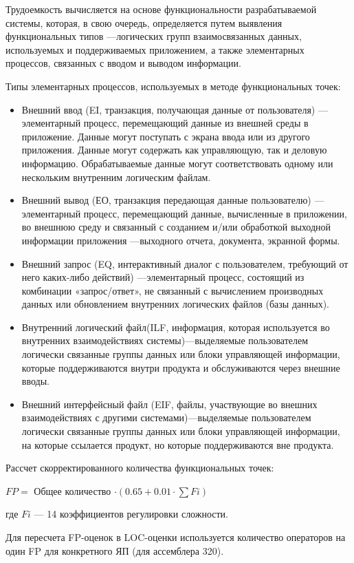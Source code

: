 \documentclass[a4paper,14pt]{article}
\begin{document}
Трудоемкость вычисляется на основе функциональности разрабатываемой системы, которая, в свою очередь, определяется путем выявления функциональных типов —логических групп взаимосвязанных данных, используемых и поддерживаемых приложением, а также элементарных процессов, связанных с вводом и выводом информации.

Типы элементарных процессов, используемых в методе функциональных точек:

\begin{itemize}
    \item Внешний ввод (EI, транзакция, получающая данные от пользователя) —элементарный процесс, перемещающий данные из внешней среды в приложение. Данные могут поступать с экрана ввода или из другого приложения. Данные могут содержать как управляющую, так и деловую информацию. Обрабатываемые данные могут соответствовать одному или нескольким внутренним логическим файлам.
    \item Внешний вывод (ЕО, транзакция передающая данные пользователю) —элементарный процесс, перемещающий данные, вычисленные в приложении, во внешнюю среду и связанный с созданием и/или обработкой выходной информации приложения —выходного отчета, документа, экранной формы.
    \item Внешний запрос (EQ, интерактивный диалог с пользователем, требующий от него каких-либо действий) —элементарный процесс, состоящий из комбинации «запрос/ответ», не связанный с вычислением производных данных или обновлением внутренних логических файлов (базы данных).
    \item Внутренний логический файл(ILF, информация, которая используется  во внутренних взаимодействиях системы)—выделяемые пользователем логически связанные группы данных или блоки управляющей информации, которые поддерживаются внутри продукта и обслуживаются через внешние вводы.
    \item Внешний интерфейсный файл (EIF, файлы, участвующие во внешних взаимодействиях с другими системами)—выделяемые пользователем логически связанные группы данных или блоки управляющей информации, на которые ссылается продукт, но которые поддерживаются вне продукта.
\end{itemize}

Рассчет скорректированного количества функциональных точек:

$FP = $ Общее количество $\cdot (0.65 + 0.01 \cdot \sum Fi)$

где $Fi$ — 14 коэффициентов регулировки сложности.

Для пересчета FP-оценок в LOC-оценки используется количество операторов на один FP для конкретного ЯП (для ассемблера 320).
\end{document}
